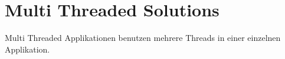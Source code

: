 \section{Multi Threaded Solutions}
\label{section: Multi Threaded Solutions}

Multi Threaded Applikationen benutzen mehrere Threads in einer einzelnen Applikation. \cite[p. 1]{DabMIT}